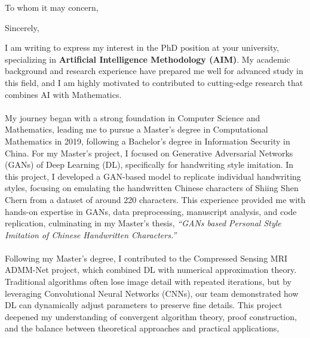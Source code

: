 \documentclass[11pt,a4paper, final]{moderncv}
\begin{document}
\date{\today}
\opening{To whom it may concern,}
\closing{Sincerely,}
\makelettertitle
I am writing to express my interest in the PhD position at your university, 
specializing in \textbf{Artificial Intelligence Methodology (AIM)}. 
My academic background and research experience have prepared me well for advanced study in this field, 
and I am highly motivated to contributed to cutting-edge research that combines AI with Mathematics. 
\ \\
\ \\
My journey began with a strong foundation in Computer Science and Mathematics, 
leading me to pursue a Master's degree in Computational Mathematics in 2019, 
following a Bachelor's degree in Information Security in China. 
For my Master's project, I focused on Generative Adversarial Networks (GANs) of Deep Learning (DL), 
specifically for handwriting style imitation. 
In this project, I developed a GAN-based model to replicate individual handwriting styles, 
focusing on emulating the handwritten Chinese characters of Shiing Shen Chern from a dataset of around 220 characters. 
This experience provided me with hands-on expertise in GANs, 
data preprocessing, manuscript analysis, and code replication, 
culminating in my Master's thesis, \emph{“GANs based Personal Style Imitation of Chinese Handwritten Characters.”}
\ \\
\ \\
Following my Master's degree, 
I contributed to the Compressed Sensing MRI ADMM-Net project, 
which combined DL with numerical approximation theory. 
Traditional algorithms often lose image detail with repeated iterations, 
but by leveraging Convolutional Neural Networks (CNNs), 
our team demonstrated how DL can dynamically adjust parameters to preserve fine details. 
This project deepened my understanding of convergent algorithm theory, proof construction, 
and the balance between theoretical approaches and practical applications, 
\end{document}
